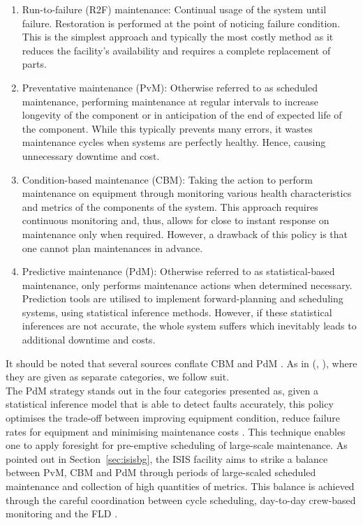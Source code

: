 \documentclass[10pt,oneside]{report}
\renewcommand{\citet}[1]{\citeauthor{#1}, \citeyear{#1}}
\begin{document}
\begin{enumerate}
    \item{Run-to-failure (R2F) maintenance: Continual usage of the system until failure. Restoration is performed at the point of noticing failure condition. This is the simplest approach and typically the most costly method as it reduces the facility's availability and requires a complete replacement of parts.} 
    \item{Preventative maintenance (PvM): Otherwise referred to as scheduled maintenance, performing maintenance at regular intervals to increase longevity of the component or in anticipation of the end of expected life of the component. While this typically prevents many errors, it wastes maintenance cycles when systems are perfectly healthy. Hence, causing unnecessary downtime and cost.}
    \item{Condition-based maintenance (CBM): Taking the action to perform maintenance on equipment through monitoring various health characteristics and metrics of the components of the system. This approach requires continuous monitoring and, thus, allows for close to instant response on maintenance only when required. However, a drawback of this policy is that one cannot plan maintenances in advance.}
    \item{Predictive maintenance (PdM): Otherwise referred to as statistical-based maintenance, only performs maintenance actions when determined necessary. Prediction tools are utilised to implement forward-planning and scheduling systems, using statistical inference methods. However, if these statistical inferences are not accurate, the whole system suffers which inevitably leads to additional downtime and costs.}
\end{enumerate}
It should be noted that several sources conflate CBM and PdM \cite{mobley2002introduction}. As in (\citet{susto2012predictive}), where they are given as separate categories, we follow suit. \\ 

The PdM strategy stands out in the four categories presented as, given a statistical inference model that is able to detect faults accurately, this policy optimises the trade-off between improving equipment condition, reduce failure rates for equipment and minimising maintenance costs \cite{carvalho2019systematic}. This technique enables one to apply foresight for pre-emptive scheduling of large-scale maintenance. As pointed out in Section~\ref{sec:isisbg}, the ISIS facility aims to strike a balance between PvM, CBM and PdM through periods of large-scaled scheduled maintenance and collection of high quantities of metrics. This balance is achieved through the careful coordination between cycle scheduling, day-to-day crew-based monitoring and the FLD \cite{thomason2019isis}.
\end{document}
